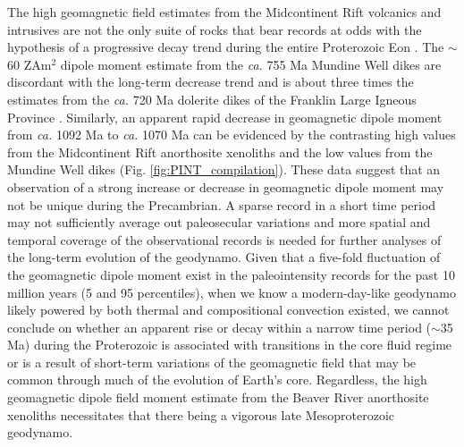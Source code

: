 \documentclass[9pt,twocolumn,twoside,lineno]{pnas-new}
\begin{document}
The high geomagnetic field estimates from the Midcontinent Rift volcanics and intrusives are not the only suite of rocks that bear records at odds with the hypothesis of a progressive decay trend during the entire Proterozoic Eon \cite{Biggin2009a, Bono2019a}. The $\sim$60 ZAm$^2$ dipole moment estimate from the \textit{ca.} 755 Ma Mundine Well dikes are discordant with the long-term decrease trend \cite{Bono2019a} and is about three times the estimates from the \textit{ca.} 720 Ma dolerite dikes of the Franklin Large Igneous Province \cite{Lloyd2021a}. Similarly, an apparent rapid decrease in geomagnetic dipole moment from \textit{ca.} 1092 Ma to \textit{ca.} 1070 Ma can be evidenced by the contrasting high values from the Midcontinent Rift anorthosite xenoliths and the low values from the Mundine Well dikes (Fig. \ref{fig:PINT_compilation}). These data suggest that an observation of a strong increase or decrease in geomagnetic dipole moment may not be unique during the Precambrian. A sparse record in a short time period may not sufficiently average out paleosecular variations and more spatial and temporal coverage of the observational records is needed for further analyses of the long-term evolution of the geodynamo. Given that a five-fold fluctuation of the geomagnetic dipole moment exist in the paleointensity records for the past 10 million years (5 and 95 percentiles), when we know a modern-day-like geodynamo likely powered by both thermal and compositional convection existed, we cannot conclude on whether an apparent rise or decay within a narrow time period ($\sim$35 Ma) during the Proterozoic is associated with transitions in the core fluid regime or is a result of short-term variations of the geomagnetic field that may be common through much of the evolution of Earth's core. Regardless, the high geomagnetic dipole field moment estimate from the Beaver River anorthosite xenoliths necessitates that there being a vigorous late Mesoproterozoic geodynamo. 

\end{document}
